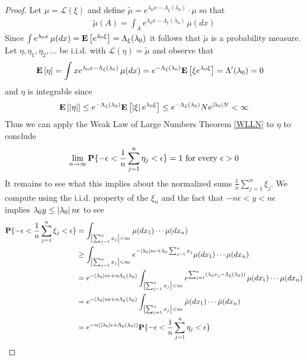 \begin{proof}
Let $\mu = \mathcal{L}(\xi)$ and define $\tilde{\mu} = e^{\lambda_0 x - \Lambda_\xi(\lambda_0)} \cdot \mu$ so that
\begin{align*}
\tilde{\mu}(A) = \int_A e^{\lambda_0 x - \Lambda_\xi(\lambda_0)} \, \mu(dx)
\end{align*}
Since $\int e^{\lambda_0 x} \, \mu(dx) = \textbf{E}\left[e^{\lambda_0 \xi}\right] = \Lambda_\xi(\lambda_0)$ it follows that $\tilde{\mu}$ is a probability measure.  Let $\eta, \eta_1, \eta_2, \dotsc$ be i.i.d. with $\mathcal{L}(\eta) = \tilde{\mu}$ and observe that
\begin{align*}
\textbf{E}\left[\eta\right] &= \int x  e^{\lambda_0 x  - \Lambda_\xi(\lambda_0)} \, \mu(dx) = e^{-\Lambda_\xi(\lambda_0)} \textbf{E}\left[\xi e^{\lambda_0 \xi}\right] = \Lambda^\prime(\lambda_0) = 0
\end{align*}
and $\eta$ is integrable since 
\begin{align*}
\textbf{E}\left[\left \vert \eta \right \vert\right] \leq  e^{-\Lambda_\xi(\lambda_0)} \textbf{E}\left[\left \vert \xi \right \vert e^{\lambda_0 \xi}\right] \leq e^{-\Lambda_\xi(\lambda_0)}  N e^{\left \vert \lambda_0 \right \vert N} < \infty
\end{align*}
Thus we can apply the Weak Law of Large Numbers Theorem \ref{WLLN} to $\eta$ to conclude
\begin{align*}
\lim_{n \to \infty} \textbf{P}\{ -\epsilon < \frac{1}{n} \sum_{j=1}^n \eta_j < \epsilon\} = 1 \text{ for every $\epsilon > 0$}
\end{align*}
It remains to see what this implies about the normalized sums $\frac{1}{n} \sum_{j=1}^n \xi_j$.  We compute using the i.i.d. property of the $\xi_n$ and the fact that $-n \epsilon < y < n \epsilon$ implies $\lambda_0 y \leq \left \vert \lambda_0 \right \vert n \epsilon$ to see
\begin{align*}
\probability{-\epsilon < \frac{1}{n} \sum_{j=1}^n \xi_j < \epsilon} &= \int_{\abs{\sum_{j=1}^n x_j} < n \epsilon} \mu(dx_1) \dotsb \mu(dx_n) \\
&\geq \int_{\abs{\sum_{j=1}^n x_j} < n \epsilon} e^{-\abs{\lambda_0} n \epsilon + \lambda_0 \sum_{j=1}^n x_j} \mu(dx_1) \dotsb \mu(dx_n) \\
&=  e^{-\abs{\lambda_0} n \epsilon + n \Lambda_\xi(\lambda_0)} \int_{\abs{\sum_{j=1}^n x_j} < n \epsilon} e^{\sum_{j=1}^n (\lambda_0  x_j - \Lambda_\xi(\lambda_0))} \, \mu(dx_1) \dotsb \mu(dx_n) \\
&=  e^{-\abs{\lambda_0} n \epsilon + n \Lambda_\xi(\lambda_0)} \int_{\abs{\sum_{j=1}^n x_j} < n \epsilon} \tilde{\mu}(dx_1) \dotsb \tilde{\mu}(dx_n) \\
&=e^{-n(\abs{\lambda_0} \epsilon + \Lambda_\xi(\lambda_0))} \probability{-\epsilon < \frac{1}{n} \sum_{j=1}^n \eta_j < \epsilon}

\end{align*}
\end{proof}
